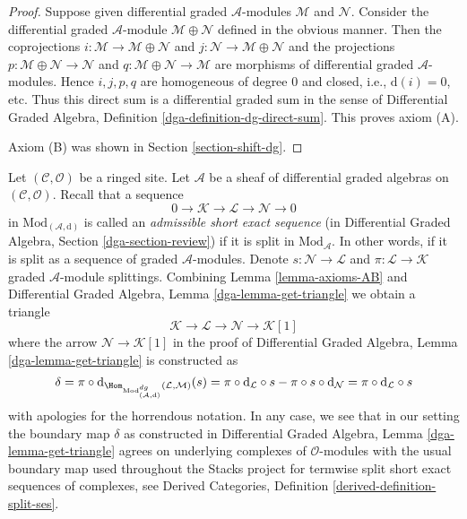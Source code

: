 \begin{proof}
Suppose given differential graded $\mathcal{A}$-modules
$\mathcal{M}$ and $\mathcal{N}$. Consider the
differential graded $\mathcal{A}$-module $\mathcal{M} \oplus \mathcal{N}$
defined in the obvious manner. Then the coprojections
$i : \mathcal{M} \to \mathcal{M} \oplus \mathcal{N}$ and
$j : \mathcal{N} \to \mathcal{M} \oplus \mathcal{N}$ and the
projections
$p : \mathcal{M} \oplus \mathcal{N} \to \mathcal{N}$ and
$q : \mathcal{M} \oplus \mathcal{N} \to \mathcal{M}$
are morphisms of differential graded $\mathcal{A}$-modules.
Hence $i, j, p, q$ are homogeneous
of degree $0$ and closed, i.e., $\text{d}(i) = 0$, etc.
Thus this direct sum is a differential graded sum in the sense of
Differential Graded Algebra, Definition \ref{dga-definition-dg-direct-sum}.
This proves axiom (A).

\medskip\noindent
Axiom (B) was shown in Section \ref{section-shift-dg}.
\end{proof}

\medskip\noindent
Let $(\mathcal{C}, \mathcal{O})$ be a ringed site.
Let $\mathcal{A}$ be a sheaf of differential graded algebras
on $(\mathcal{C}, \mathcal{O})$.
Recall that a sequence
$$
0 \to \mathcal{K} \to \mathcal{L} \to \mathcal{N} \to 0
$$
in $\text{Mod}_{(\mathcal{A}, \text{d})}$
is called an {\it admissible short exact sequence}
(in Differential Graded Algebra, Section \ref{dga-section-review})
if it is split in $\text{Mod}_\mathcal{A}$. In other words, if it is split
as a sequence of graded $\mathcal{A}$-modules. Denote
$s : \mathcal{N} \to \mathcal{L}$ and
$\pi : \mathcal{L} \to \mathcal{K}$
graded $\mathcal{A}$-module splittings.
Combining Lemma \ref{lemma-axioms-AB} and 
Differential Graded Algebra, Lemma \ref{dga-lemma-get-triangle}
we obtain a triangle
$$
\mathcal{K} \to \mathcal{L} \to \mathcal{N} \to \mathcal{K}[1]
$$
where the arrow $\mathcal{N} \to \mathcal{K}[1]$ in the proof
of Differential Graded Algebra, Lemma \ref{dga-lemma-get-triangle}
is constructed as
$$
\delta = \pi \circ
\text{d}_{\Hom_{\text{Mod}^{dg}_{(\mathcal{A}, \text{d})}}
(\mathcal{L}, \mathcal{M})}(s) =
\pi \circ \text{d}_\mathcal{L} \circ s -
\pi \circ s \circ \text{d}_\mathcal{N} =
\pi \circ \text{d}_\mathcal{L} \circ s
$$
with apologies for the horrendous notation. In any case, we see that
in our setting the boundary map $\delta$ as constructed in
Differential Graded Algebra, Lemma \ref{dga-lemma-get-triangle}
agrees on underlying complexes of $\mathcal{O}$-modules
with the usual boundary map used throughout the Stacks project
for termwise split short exact sequences of complexes, see
Derived Categories, Definition \ref{derived-definition-split-ses}.

